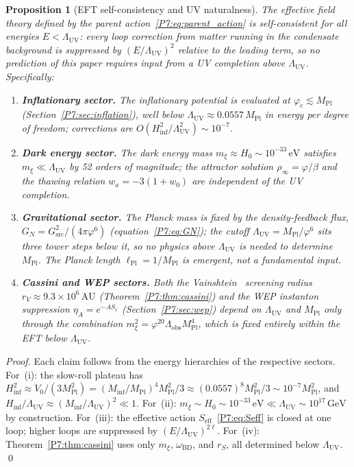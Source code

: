 \documentclass[11pt,a4paper]{article}
\newtheorem{proposition}[theorem]{Proposition}
\theoremstyle{definition}
\theoremstyle{remark}
\newcommand{\vp}{\varphi}
\newcommand{\MPl}{M_{\mathrm{Pl}}}
\newcommand{\LUV}{\Lambda_{\mathrm{UV}}}
\newcommand{\Lobs}{\Lambda_{\mathrm{obs}}}
\newcommand{\rinfty}{\rho_{\infty}}
\newcommand{\oBD}{\omega_{\mathrm{BD}}}
\begin{document}
\begin{proposition}[EFT self-consistency and UV naturalness]
\label{P7:prop:eft_naturalness}
The effective field theory defined by the parent action~\eqref{P7:eq:parent_action}
is self-consistent for all energies $E < \LUV$: every loop correction
from matter running in the condensate background is suppressed by
$(E/\LUV)^2$ relative to the leading term, so no prediction of this
paper requires input from a UV completion above $\LUV$.
Specifically:
\begin{enumerate}[noitemsep,label=\emph{(\roman*)}]
\item \textbf{Inflationary sector.} The inflationary potential is
  evaluated at $\varphi_c\lesssim\MPl$ (Section~\ref{P7:sec:inflation}),
  well below $\LUV\approx0.0557\,\MPl$ in energy per degree of freedom;
  corrections are $O(H_{\mathrm{inf}}^2/\LUV^2)\sim10^{-7}$.
\item \textbf{Dark energy sector.} The dark energy mass
  $m_\xi\approx H_0\sim10^{-33}\,\mathrm{eV}$ satisfies
  $m_\xi\ll\LUV$ by 52 orders of magnitude; the attractor
  solution $\rinfty=\vp/\beta$ and the thawing relation
  $w_a=-3(1+w_0)$ are independent of the UV completion.
\item \textbf{Gravitational sector.} The Planck mass is fixed by the
  density-feedback flux, $G_N=G_{\mathrm{src}}^2/(4\pi\vp^6)$
  (equation~\eqref{P7:eq:GN}); the cutoff $\LUV=\MPl/\vp^6$ sits three
  tower steps below it, so no physics above $\LUV$ is needed to determine
  $\MPl$.  The Planck length $\ell_{\mathrm{Pl}}=1/\MPl$ is emergent, not
  a fundamental input.
\item \textbf{Cassini and WEP sectors.} Both the Vainshtein~\cite{Vainshtein1972} screening
  radius $r_V\approx9.3\times10^6\,\mathrm{AU}$ (Theorem~\ref{P7:thm:cassini})
  and the WEP instanton suppression $\eta_A=e^{-AS_1}$
  (Section~\ref{P7:sec:wep}) depend on $\LUV$ and $\MPl$ only through
  the combination $m_\xi^2=\vp^{20}\Lobs\MPl^4$, which is
  fixed entirely within the EFT below $\LUV$.
\end{enumerate}
\end{proposition}

\begin{proof}
Each claim follows from the energy hierarchies of the respective
sectors.  For~(i): the slow-roll plateau has
$H_{\mathrm{inf}}^2\approx V_0/(3\MPl^2)=(M_{\mathrm{inf}}/\MPl)^4\MPl^2/3
\approx(0.0557)^8\MPl^2/3\sim10^{-7}\MPl^2$, and $H_{\mathrm{inf}}/\LUV
\approx(M_{\mathrm{inf}}/\LUV)^2\ll1$.
For~(ii): $m_\xi\sim H_0\sim10^{-33}\,\mathrm{eV}\ll\LUV\sim10^{17}\,\mathrm{GeV}$
by construction.
For~(iii): the effective action $S_{\mathrm{eff}}$~\eqref{P7:eq:Seff} is closed
at one loop; higher loops are suppressed by $(E/\LUV)^{2\ell}$.
For~(iv): Theorem~\ref{P7:thm:cassini} uses only $m_\xi$, $\oBD$, and $r_S$,
all determined below $\LUV$.
\qed
\end{proof}
\end{document}
